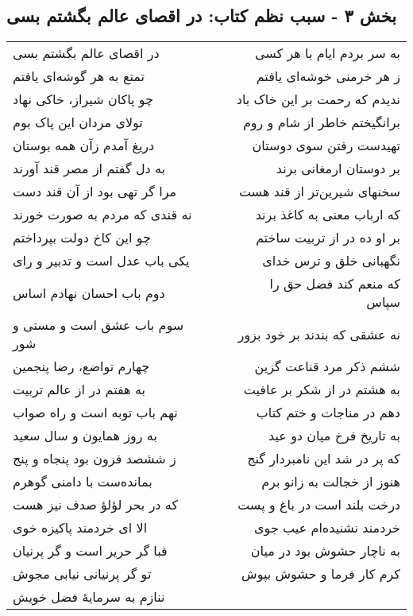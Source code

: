 \begin{center}
\section*{بخش ۳ - سبب نظم کتاب: در اقصای عالم بگشتم بسی}
\label{sec:003}
\begin{longtable}{l p{0.5cm} r}
در اقصای عالم بگشتم بسی
&&
به سر بردم ایام با هر کسی
\\
تمتع به هر گوشه‌ای یافتم
&&
ز هر خرمنی خوشه‌ای یافتم
\\
چو پاکان شیراز، خاکی نهاد
&&
ندیدم که رحمت بر این خاک باد
\\
تولای مردان این پاک بوم
&&
برانگیختم خاطر از شام و روم
\\
دریغ آمدم زآن همه بوستان
&&
تهیدست رفتن سوی دوستان
\\
به دل گفتم از مصر قند آورند
&&
بر دوستان ارمغانی برند
\\
مرا گر تهی بود از آن قند دست
&&
سخنهای شیرین‌تر از قند هست
\\
نه قندی که مردم به صورت خورند
&&
که ارباب معنی به کاغذ برند
\\
چو این کاخ دولت بپرداختم
&&
بر او ده در از تربیت ساختم
\\
یکی باب عدل است و تدبیر و رای
&&
نگهبانی خلق و ترس خدای
\\
دوم باب احسان نهادم اساس
&&
که منعم کند فضل حق را سپاس
\\
سوم باب عشق است و مستی و شور
&&
نه عشقی که بندند بر خود بزور
\\
چهارم تواضع، رضا پنجمین
&&
ششم ذکر مرد قناعت گزین
\\
به هفتم در از عالم تربیت
&&
به هشتم در از شکر بر عافیت
\\
نهم باب توبه است و راه صواب
&&
دهم در مناجات و ختم کتاب
\\
به روز همایون و سال سعید
&&
به تاریخ فرخ میان دو عید
\\
ز ششصد فزون بود پنجاه و پنج
&&
که پر در شد این نامبردار گنج
\\
بمانده‌ست با دامنی گوهرم
&&
هنوز از خجالت به زانو برم
\\
که در بحر لؤلؤ صدف نیز هست
&&
درخت بلند است در باغ و پست
\\
الا ای خردمند پاکیزه خوی
&&
خردمند نشنیده‌ام عیب جوی
\\
قبا گر حریر است و گر پرنیان
&&
به ناچار حشوش بود در میان
\\
تو گر پرنیانی نیابی مجوش
&&
کرم کار فرما و حشوش بپوش
\\
ننازم به سرمایهٔ فضل خویش

\end{longtable}
\end{center}
